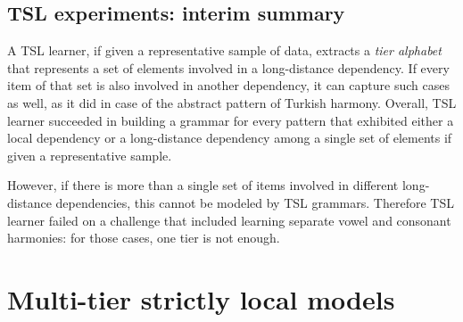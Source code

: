\begin{table}[h!]
\centering
{}
\caption{TSL learning of first-last harmony; abstract representation.}
\end{table}



\subsection{TSL experiments: interim summary}

A TSL learner, if given a representative sample of data, extracts a \emph{tier alphabet} that represents a set of elements involved in a long-distance dependency.
If every item of that set is also involved in another dependency, it can capture such cases as well, as it did in case of the abstract pattern of Turkish harmony.
Overall, TSL learner succeeded in building a grammar for every pattern that exhibited either a local dependency or a long-distance dependency among a single set of elements if given a representative sample.

However, if there is more than a single set of items involved in different long-distance dependencies, this cannot be modeled by TSL grammars.
Therefore TSL learner failed on a challenge that included learning separate vowel and consonant harmonies: for those cases, one tier is not enough.


\section{Multi-tier strictly local models}

